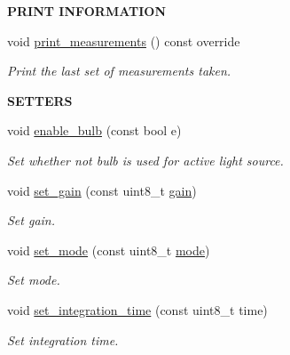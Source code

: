 \begin{Indent}{\bf P\+R\+I\+NT I\+N\+F\+O\+R\+M\+A\+T\+I\+ON}\par
\begin{DoxyCompactItemize}
\item 
void \hyperlink{class_loom___a_s7265_x_a07cd853cf0f22d3290920a3059359e0b}{print\+\_\+measurements} () const override
\begin{DoxyCompactList}\small\item\em Print the last set of measurements taken. \end{DoxyCompactList}\end{DoxyCompactItemize}
\end{Indent}
\begin{Indent}{\bf S\+E\+T\+T\+E\+RS}\par
\begin{DoxyCompactItemize}
\item 
void \hyperlink{class_loom___a_s7265_x_aff26c05d0ec04a7117e07a91bd6d100e}{enable\+\_\+bulb} (const bool e)
\begin{DoxyCompactList}\small\item\em Set whether not bulb is used for active light source. \end{DoxyCompactList}\item 
void \hyperlink{class_loom___a_s7265_x_a348d8bfd4d4d90a5c0ac6d2f37be1ac1}{set\+\_\+gain} (const uint8\+\_\+t \hyperlink{class_loom___a_s7265_x_a204831caa774ead3b9ba57495e17bfd9}{gain})
\begin{DoxyCompactList}\small\item\em Set gain. \end{DoxyCompactList}\item 
void \hyperlink{class_loom___a_s7265_x_a80b09ed31d462def8b4347feb44d3187}{set\+\_\+mode} (const uint8\+\_\+t \hyperlink{class_loom___a_s7265_x_a02bc2eaf8dfea91f9f47a19f49dcc1e9}{mode})
\begin{DoxyCompactList}\small\item\em Set mode. \end{DoxyCompactList}\item 
void \hyperlink{class_loom___a_s7265_x_a0e952773e0dd008f4ec831f0d8b10e2c}{set\+\_\+integration\+\_\+time} (const uint8\+\_\+t time)
\begin{DoxyCompactList}\small\item\em Set integration time. \end{DoxyCompactList}\end{DoxyCompactItemize}
\end{Indent}
